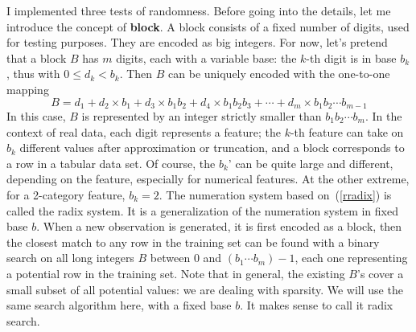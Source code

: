 \documentclass[oneside,10pt]{book}
\begin{document}
I implemented three tests of randomness. Before going into the details, let me introduce the concept of {\bf block}. A block consists of a fixed number of digits, used for testing purposes. They are encoded as big integers. For now, let's pretend that a block $B$ has $m$ digits, each with a variable base:
 the $k$-th digit is in base $b_k$, thus with $0\leq d_k < b_k$. Then $B$ can be uniquely encoded with the one-to-one mapping
\begin{equation}
B = d_1 + d_2 \times b_1 + d_3 \times b_1b_2 + d_4 \times b_1b_2b_3 + \cdots + d_m \times b_1b_2\cdots b_{m-1}\label{rradix}
\end{equation}
In this case, $B$ is represented by an integer strictly smaller than $b_1b_2\cdots b_m$. In the context of real data, each digit represents a feature; the $k$-th feature can take on $b_k$ different values after approximation or truncation, and a block corresponds to a row in a tabular data set. Of course, the $b_k$' can be quite large and different, depending on the feature, especially for numerical features. At the other extreme, for a 2-category feature, 
 $b_k = 2$. The numeration system based on~(\ref{rradix}) is called the 
\textcolor{index}{radix system}. It is a generalization of the numeration system in fixed base $b$. When a new observation is generated, it is first encoded as a block, then the closest match to any row in the training set can be found with a binary search on all long integers $B$ between $0$ and $(b_1\cdots b_m) -1$, each one representing a potential row in the training set. Note that in general, the existing $B$'s cover a small subset of all potential values: we are dealing with sparsity. 
We will use the same search algorithm here, with a fixed base $b$. It makes sense to call it \textcolor{index}{radix search}.
\end{document}
